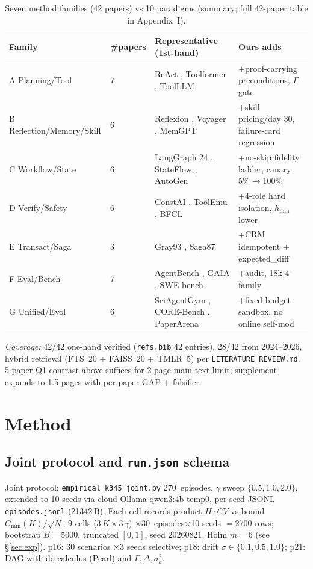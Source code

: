 \documentclass[10pt]{article}
\begin{document}
\begin{table}[ht]\centering\caption{Seven method families (42 papers) vs 10 paradigms (summary; full 42-paper table in Appendix~I).}\label{tab:families}
\begin{tabular}{llp{3.8cm}p{4.8cm}}
\toprule Family & \#papers & Representative (1st-hand) & Ours adds\\
\midrule A Planning/Tool & 7 & ReAct \cite{yao2023react}, Toolformer \cite{schick2023toolformer}, ToolLLM \cite{qin2024toolllm} & +proof-carrying preconditions, $\Gamma$ gate\\
B Reflection/Memory/Skill & 6 & Reflexion \cite{shinn2023reflexion}, Voyager \cite{wang2023voyager}, MemGPT \cite{packer2024memgpt} & +skill pricing/day 30, failure-card regression\\
C Workflow/State & 6 & LangGraph 24 \cite{langchain2024langgraph}, StateFlow \cite{zhou2023stateflow}, AutoGen \cite{wu2023autogen} & +no-skip fidelity ladder, canary 5\%$\to$100\%\\
D Verify/Safety & 6 & ConstAI \cite{bai2022constitutional}, ToolEmu \cite{ruan2023toolemu}, BFCL \cite{xu2024bfcl} & +4-role hard isolation, $h_{\min}$ lower\\
E Transact/Saga & 3 & Gray93 \cite{gray1993transaction}, Saga87 \cite{garcia1987saga} & +CRM idempotent + expected\_diff\\
F Eval/Bench & 7 & AgentBench \cite{liu2024agentbench}, GAIA \cite{mialon2024gaia}, SWE-bench \cite{jimenez2024swebench} & +audit, 18k 4-family\\
G Unified/Evol & 6 & SciAgentGym \cite{chen2025sciagentgym}, CORE-Bench \cite{sukhai2024corebench}, PaperArena \cite{lee2025paperarena} & +fixed-budget sandbox, no online self-mod\\
\bottomrule
\end{tabular}
\end{table}
{\em Coverage:} 42/42 one-hand verified (\texttt{refs.bib} 42 entries), 28/42 from 2024--2026, hybrid retrieval (FTS~20 + FAISS~20 + TMLR~5) per \texttt{LITERATURE\_REVIEW.md}. 5-paper Q1 contrast above suffices for 2-page main-text limit; supplement expands to 1.5 pages with per-paper GAP + falsifier.

\section{Method}\label{sec:method}
\subsection{Joint protocol and \texttt{run.json} schema}
Joint protocol: \texttt{empirical\_k345\_joint.py} 270~episodes, $\gamma$ sweep $\{0.5,1.0,2.0\}$, extended to 10 seeds via cloud Ollama qwen3:4b temp0, per-seed JSONL \texttt{episodes.jsonl} (21342\,B). Each cell records product $H\!\cdot\!CV$ vs bound $C_{\min}(K)/\sqrt{N}$; 9 cells (3$\,K\times$3$\,\gamma$) $\times$30~episodes$\times$10 seeds $=$2700 rows; bootstrap $B{=}5000$, truncated $[0,1]$, seed $20260821$, Holm $m{=}6$ (see \S\ref{sec:exp}). p16: 30 scenarios $\times$3 seeds selective; p18: drift $\sigma\in\{0.1,0.5,1.0\}$; p21: DAG with do-calculus (Pearl) and $\Gamma,\Delta,\sigma_b^2$.
\end{document}
